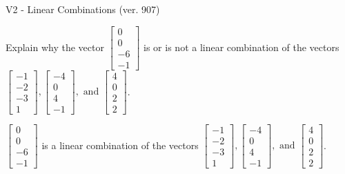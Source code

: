 \begin{exercise}
  \begin{exerciseTitle}V2 - Linear Combinations (ver. 907)\end{exerciseTitle}
  \begin{exerciseStatement}
    Explain why the vector \(\left[\begin{array}{c}
0 \\
0 \\
-6 \\
-1
\end{array}\right]\)  is or is not a linear 
	combination of the vectors \(\left[\begin{array}{c}
-1 \\
-2 \\
-3 \\
1
\end{array}\right] , \left[\begin{array}{c}
-4 \\
0 \\
4 \\
-1
\end{array}\right] , \text{ and } \left[\begin{array}{c}
4 \\
0 \\
2 \\
2
\end{array}\right]\).
	


  \end{exerciseStatement}
  \begin{exerciseAnswer}
   \(\left[\begin{array}{c}
0 \\
0 \\
-6 \\
-1
\end{array}\right]\) 
  	 is  
	a linear combination of the vectors \(\left[\begin{array}{c}
-1 \\
-2 \\
-3 \\
1
\end{array}\right] , \left[\begin{array}{c}
-4 \\
0 \\
4 \\
-1
\end{array}\right] , \text{ and } \left[\begin{array}{c}
4 \\
0 \\
2 \\
2
\end{array}\right]\).

	
  


  \end{exerciseAnswer}
\end{exercise}